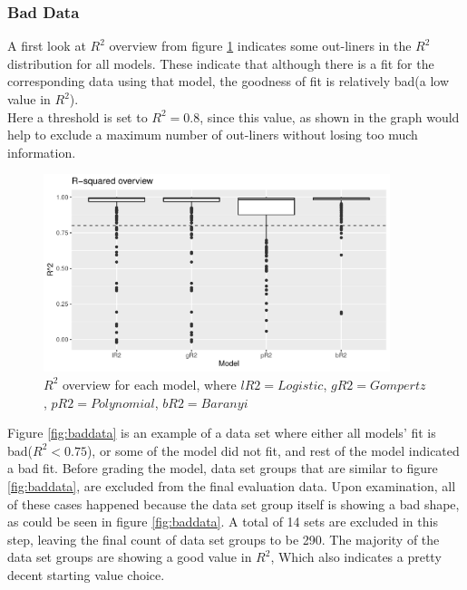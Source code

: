\documentclass[11pt]{article}
\begin{document}
\subsubsection{Bad Data}
A first look at $R^2$ overview from figure \ref{fig:r2} indicates  some out-liners in the $R^2$ distribution for all models. These indicate that although there is a fit for the corresponding data using that model, the goodness of fit is relatively bad(a low value in $R^2$).\\
Here a threshold is set to $R^2 = 0.8$, since this value, as shown in the graph would help to exclude a maximum number of out-liners without losing too much information.
\FloatBarrier
\begin{figure}[!htbp]
    \centering
    \includegraphics[width=0.9\textwidth]{../Results/anaPlots/r2snap.pdf}
    \caption{$R^2$ overview for each model, where $lR2=Logistic$, $gR2=Gompertz$, $pR2=Polynomial$, $bR2=Baranyi$}
    \label{fig:r2}
\end{figure}
\FloatBarrier
Figure \ref{fig:baddata} is an example of a data set where either all models' fit is bad($R^2 < 0.75$), or some of the model did not fit, and rest of the model indicated a bad fit. Before grading the model, data set groups that are similar to figure \ref{fig:baddata}, are excluded from the final evaluation data. Upon examination, all of these cases happened because the data set group itself is showing a bad shape, as could be seen in figure \ref{fig:baddata}. A total of 14 sets are excluded in this step, leaving the final count of data set groups to be 290. The majority of the data set groups are showing a good value in $R^2$, Which also indicates a pretty decent starting value choice.
\FloatBarrier
\end{document}
